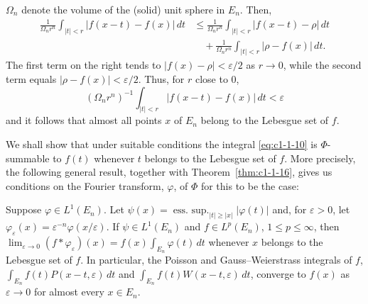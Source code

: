 $\Omega_{n}$ denote the volume of the (solid) unit sphere in $E_{n}$. Then,
\begin{align*}
\frac{1}{\Omega_{n} r^{n}}\int_{|t|<r}|f(x-t)-f(x)|\,dt
&\leq\frac{1}{\Omega_{n} r^{n}}\int_{|t|<r}|f(x-t)-\rho|\,dt\\
&\quad+\frac{1}{\Omega_{n} r^{n}}\int_{|t|<r}|\rho-f(x)|\,dt.
\end{align*}
The first term on the right tends to $|f(x) - \rho| < \varepsilon/2$ as
$r \to 0$, while the second term equals $|\rho - f(x)| < \varepsilon/2$. Thus,
for $r$ close to $0$,
\[
(\Omega_{n}r^{n})^{-1}\int_{|t|<r}|f(x-t)-f(x)|\,dt<\varepsilon
\]
and it follows that almost all points $x$ of $E_{n}$ belong to the Lebesgue set
of $f$.

We shall show that under suitable conditions the integral \eqref{eq:c1-1-10} is
$\Phi$-summable to $f(t)$ whenever $t$ belongs to the Lebesgue set of $f$. More
precisely, the following general result, together with
Theorem~\ref{thm:c1-1-16}, gives us conditions on the Fourier transform,
$\varphi$, of $\Phi$ for this to be the case:

\begin{theorem}\label{thm:c1-1-25}
Suppose $\varphi \in L^{1}(E_{n})$. Let
$\psi(x) = \operatorname{ess.\ sup.}_{|t| \geq |x|}|\varphi(t)|$ and, for
$\varepsilon > 0$, let $\varphi_{\varepsilon}(x) = \varepsilon^{-n}\varphi(x/\varepsilon)$.
If $\psi \in L^{1}(E_{n})$ and $f \in L^{p}(E_{n})$, $1 \leq p \leq \infty$, then
$\lim_{\varepsilon \to 0}(f * \varphi_{\varepsilon})(x) = f(x) \int_{E_{n}} \varphi(t) \, dt$
whenever $x$ belongs to the Lebesgue set of $f$. In particular, the Poisson and
Gauss--Weierstrass integrals of $f$,
$\int_{E_{n}} f(t)P(x - t, \varepsilon) \, dt$ and
$\int_{E_{n}} f(t)W(x - t, \varepsilon) \, dt$, converge to $f(x)$ as
$\varepsilon \to 0$ for almost every $x \in E_{n}$.
\end{theorem}

